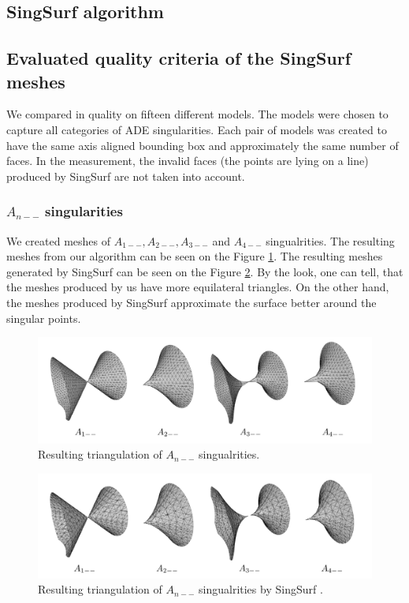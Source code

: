 \subsection{SingSurf algorithm}
\subsection{Evaluated quality criteria of the SingSurf meshes}
We compared in quality on fifteen different models. The models were chosen
to capture all categories of ADE singularities. Each pair of models was 
created to have the same axis aligned bounding box and approximately the
same number of faces. In the measurement, the invalid faces 
(the points are lying on a line) produced by SingSurf are not taken into 
account.

\subsubsection*{$A_{n--}$ singularities}
We created meshes of $A_{1--}, A_{2--}, A_{3--}$ and $A_{4--}$ singualrities.
The resulting meshes from our algorithm can be seen on the 
Figure \ref{img:46}. The resulting meshes generated by SingSurf 
can be seen on the Figure \ref{img:47}. By the look, one can tell,
that the meshes produced by us have more equilateral triangles.
On the other hand, the meshes produced by SingSurf approximate 
the surface better around the singular points.

\begin{figure}
    \centerline{\includegraphics[scale=0.5]{images/img46}}
    \caption[Resulting triangulation of $A_{n--}$ singualrities]
    {Resulting triangulation of $A_{n--}$ singualrities.}
    \label{img:46}
\end{figure}

\begin{figure}
    \centerline{\includegraphics[scale=0.5]{images/img47}}
    \caption[Resulting triangulation of $A_{n--}$ singualrities by SingSurf]
    {Resulting triangulation of $A_{n--}$ singualrities by SingSurf \cite{singsurf}.}
    \label{img:47}
\end{figure}

